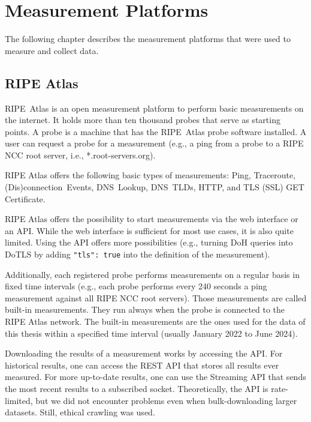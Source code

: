 \section{Measurement Platforms} \label{sec:measurement-platforms}

The following chapter describes the measurement platforms that were used to
measure and collect data.

\subsection{RIPE Atlas} \label{sec:ripe-atlas}

RIPE~Atlas is an open measurement platform to perform basic measurements on the
internet. It holds more than ten thousand probes that serve as starting points.
A probe is a machine that has the RIPE~Atlas probe software installed. A user
can request a probe for a measurement (e.g., a ping from a probe to a RIPE NCC
root server, i.e., *.root-servers.org).

RIPE Atlas offers the following basic types of measurements: Ping, Traceroute,
(Dis)connection~Events, DNS~Lookup, DNS~TLDs, HTTP, and TLS (SSL) GET
Certificate.

RIPE Atlas offers the possibility to start measurements via the web interface
or an API. While the web interface is sufficient for most use cases, it is also
quite limited. Using the API offers more possibilities (e.g., turning \ac{DoH}
queries into \ac{DoTLS} by adding \verb|"tls": true| into the definition of the
measurement).

Additionally, each registered probe performs measurements on a regular basis in
fixed time intervals (e.g., each probe performs every 240 seconds a ping
measurement against all RIPE NCC root servers). Those measurements are called
built-in measurements. They run always when the probe is connected to the RIPE
Atlas network. The built-in measurements are the ones used for the data of this
thesis within a specified time interval (usually January 2022 to June 2024).

Downloading the results of a measurement works by accessing the API. For
historical results, one can access the REST API that stores all results ever
measured. For more up-to-date results, one can use the Streaming API that sends
the most recent results to a subscribed socket. Theoretically, the API is
rate-limited, but we did not encounter problems even when bulk-downloading
larger datasets. Still, ethical crawling was used.

